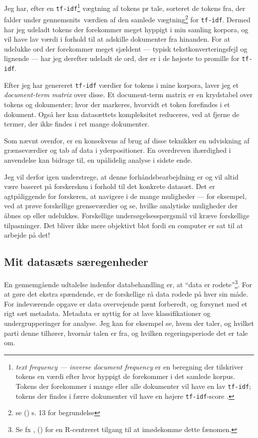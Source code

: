 Jeg har, efter en \texttt{tf-idf}\footnote{\textit{text frequency — inverse document frequency} er en beregning der tilskriver tokens en værdi efter hvor hyppigt de forekommer i det samlede korpus.
  Tokens der forekommer i mange eller alle dokumenter vil have en lav \texttt{tf-idf}; tokens der findes i færre dokumenter vil have en højere \texttt{tf-idf}-score \autocite[s. 29]{silge2017text}.} vægtning af tokens pr tale, sorteret de tokens fra, der falder under gennemsnits\ værdien af den samlede vægtning\footnote{se \citeauthor{grunTopicmodelsPackageFitting2011} (\citeyear{grunTopicmodelsPackageFitting2011}) s. 13 for begrundelse} for \texttt{tf-idf}.
Dermed har jeg udeladt tokens der forekommer meget hyppigt i min samling korpora, og vil have lav værdi i forhold til at adskille dokumenter fra hinanden.
For at udelukke ord der forekommer meget sjældent — typisk tekstkonverteringsfejl og lignende — har jeg derefter udeladt de ord, der er i de højeste to promille for \texttt{tf-idf}.

Efter jeg har genereret \texttt{tf-idf} værdier for tokens i mine korpora, laver jeg et \textit{document-term matrix} over disse.
Et document-term matrix er en krydstabel over tokens og dokumenter; hvor der markeres, hvorvidt et token forefindes i et dokument.
Også her kan datasættets kompleksitet reduceres, ved at fjerne de termer, der ikke findes i ret mange dokumenter.

Som nævnt ovenfor, er en konsekvens af brug af disse teknikker en udviskning af grænseværdier og tab af data i yderpositioner.
En overdreven ihærdighed i anvendelse kan bidrage til, en upålidelig analyse i sidste ende.

Jeg vil derfor igen understrege, at denne forhándsbearbejdning er og vil altid være baseret på forskerskøn i forhold til det konkrete datasæt.
Det er agtpåliggende for forskeren, at navigere i de mange muligheder — for eksempel, ved at prøve forskellige grenseværdier og se, hvilke analytiske muligheder der åbnes op eller udelukkes.
Forskellige undersøgelsesspørgsmål vil kræve forskellige tilpasninger.
Det bliver ikke mere objektivt blot fordi en computer er sat til at arbejde på det!

\subsection{Mit datasæts særegenheder}

En gennemgående udtalelse indenfor databehandling er, at “data er rodete”\footnote{Se fx \citeauthor{wickhamTidyData2014}, (\citeyear{wickhamTidyData2014}) for en R-centreret tilgang til at imødekomme dette fænomen.}.
For at gøre det ekstra spændende, er de forskellige rå data rodede på hver sin måde.
For indeværende opgave er data overvejende pænt forberedt, og forsynet med et rigt sæt metadata.
Metadata er nyttig for at lave klassifikationer og undergrupperinger for analyse.
Jeg kan for eksempel se, hvem der taler, og hvilket parti denne tilhører, hvornår talen er fra, og hvilken regeringsperiode det er tale om.

